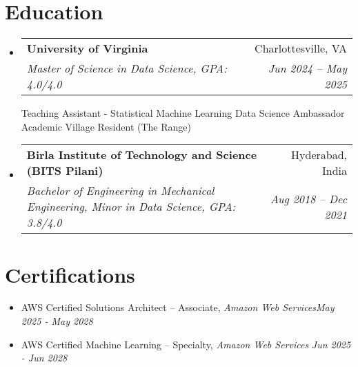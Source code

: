 \documentclass[letterpaper,11pt]{article}
\makeatletter
\newcommand{\resumeItem}[1]{
\justifying
  \item{\small{#1}}
  \vspace{-2px}
}
\newcommand{\resumeSubheading}[4]{
  \item
    \begin{tabular*}{1\textwidth}{l@{\extracolsep{\fill}}r}
      \textbf{\large{#1}} & {\small{#2}} \\
      {\textsl{{#3}}} & {\textsl{\small{#4}}}
    \end{tabular*}
  \vspace{-0.5cm}
}
\newcommand{\resumeSubHeadingListStart}{\begin{itemize}[leftmargin=0.0in, label={}]}
\newcommand{\resumeSubHeadingListEnd}{\end{itemize}}
\newcommand{\resumeItemListStart}{
  \vspace{-5pt}
  \begin{itemize}[leftmargin=0.21in, label=\textbullet]
}
\newcommand{\resumeItemListEnd}{\end{itemize}}
\makeatother
\begin{document}
\section{\Large{Education}}
\vspace{3pt}
\resumeSubHeadingListStart

\resumeSubheading
    {University of Virginia}{Charlottesville, VA}
    {Master of Science in Data Science, GPA: 4.0/4.0}{Jun 2024 -- May 2025}

\vspace{4px}
\footnotesize{
Teaching Assistant - Statistical Machine Learning {\textbullet}
Data Science Ambassador {\textbullet}
Academic Village Resident (The Range)\\




}



\resumeSubHeadingListEnd
\vspace{-14pt}
\resumeSubHeadingListStart
\resumeSubheading
    {Birla Institute of Technology and Science \normalsize{(BITS Pilani)}}{Hyderabad, India}
    {Bachelor of Engineering in Mechanical Engineering, Minor in Data Science, GPA: 3.8/4.0}{Aug 2018 -- Dec 2021}

\resumeSubHeadingListEnd


\vspace{-9pt}
\section{\Large{Certifications}}
\vspace{9pt}
\resumeItemListStart

\resumeItem{AWS Certified Solutions Architect – Associate, \textsl{Amazon Web Services}\hfill\sl{May 2025 - May 2028}}

\resumeItem{\vspace{-6pt}AWS Certified Machine Learning – Specialty, \textsl{Amazon Web Services} \hfill\sl{Jun 2025 - Jun 2028}}

\resumeItemListEnd
\end{document}
